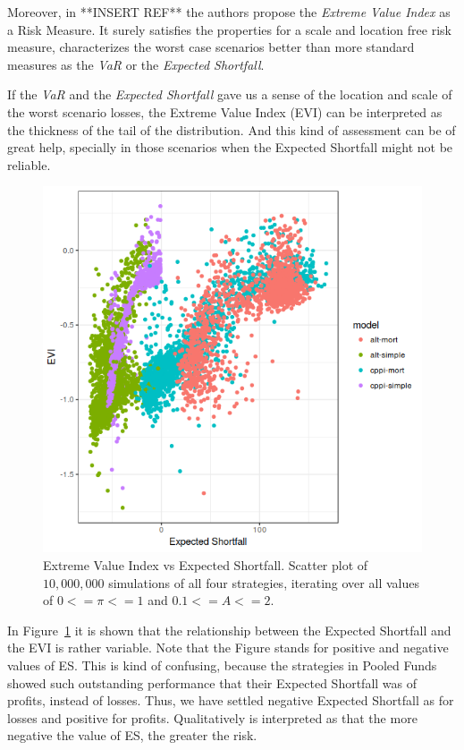 Moreover, in **INSERT REF** the authors propose the \emph{Extreme Value Index} as a Risk Measure. It surely satisfies the properties for a scale and location free risk measure, characterizes the worst case scenarios better than more standard measures as the \emph{VaR} or the \emph{Expected Shortfall}.

If the \emph{VaR} and the \emph{Expected Shortfall} gave us a sense of the location and scale of the worst scenario losses, the Extreme Value Index (EVI) can be interpreted as the thickness of the tail of the distribution. And this kind of assessment can be of great help, specially in those scenarios when the Expected Shortfall might not be reliable.

\begin{figure}[h]
    \centering
    \includegraphics[scale=0.75]{images/evi-es_new2.png}
    \caption{Extreme Value Index vs Expected Shortfall. Scatter plot of $10,000,000$ simulations of all four strategies, iterating over all values of $0 <= \pi <= 1$ and $0.1 <= A <= 2$.}
    \label{fig:evi-es}
\end{figure}

In Figure~\ref{fig:evi-es} it is shown that the relationship between the Expected Shortfall and the EVI is rather variable. Note that the Figure stands for positive and negative values of ES. This is kind of confusing, because the strategies in Pooled Funds showed such outstanding performance that their Expected Shortfall was of profits, instead of losses. Thus, we have settled negative Expected Shortfall as for losses and positive for profits. Qualitatively is interpreted as that the more negative the value of ES, the greater the risk.

